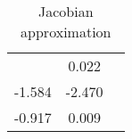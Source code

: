 
    \begin{table}\caption{Jacobian approximation}
\centering
    \begin{tabular}{|l|c|c|}
    \toprule
    \miderule2 & 0.022\\
-1.584 & -2.470\\
-0.917 & 0.009\\

      \bottomrule
      \end{tabular}
      \end{table}